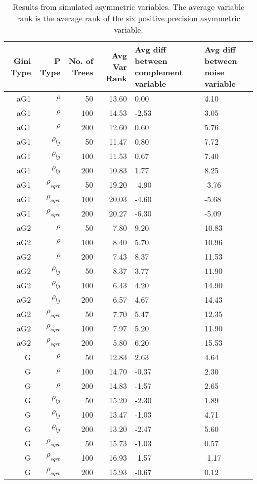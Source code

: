 \begin{table}%
  \centering
  \caption{Results from simulated asymmetric variables. The average variable rank is the average rank of the six positive precision asymmetric variable.}
\begin{tabular}{rrrrp{3cm}p{3cm}}
\hline
Gini Type & P Type & No. of Trees & Avg Var Rank & Avg diff between complement variable & Avg diff between noise variable \bigstrut\\
\hline
\renewcommand{\arraystretch}{.5}
aG1   & $\rho$ & 50    & 13.60 & 0.00  & 4.10 \bigstrut[t]\\
aG1   & $\rho$ & 100   & 14.53 & -2.53 & 3.05 \\
aG1   & $\rho$ & 200   & 12.60 & 0.60  & 5.76 \\
aG1   & $\rho_{lg}$ & 50    & 11.47 & 0.80  & 7.72 \\
aG1   & $\rho_{lg}$ & 100   & 11.53 & 0.67  & 7.40 \\
aG1   & $\rho_{lg}$ & 200   & 10.83 & 1.77  & 8.25 \\
aG1   & $\rho_{sqrt}$ & 50    & 19.20 & -4.90 & -3.76 \\
aG1   & $\rho_{sqrt}$ & 100   & 20.03 & -4.60 & -5.68 \\
aG1   & $\rho_{sqrt}$ & 200   & 20.27 & -6.30 & -5.09 \\
aG2   & $\rho$ & 50    & 7.80  & 9.20  & 10.83 \\
aG2   & $\rho$ & 100   & 8.40  & 5.70  & 10.96 \\
aG2   & $\rho$ & 200   & 7.43  & 8.37  & 11.53 \\
aG2   & $\rho_{lg}$ & 50    & 8.37  & 3.77  & 11.90 \\
aG2   & $\rho_{lg}$ & 100   & 6.43  & 4.20  & 14.90 \\
aG2   & $\rho_{lg}$ & 200   & 6.57  & 4.67  & 14.43 \\
aG2   & $\rho_{sqrt}$ & 50    & 7.70  & 5.47  & 12.35 \\
aG2   & $\rho_{sqrt}$ & 100   & 7.97  & 5.20  & 11.90 \\
aG2   & $\rho_{sqrt}$ & 200   & 5.80  & 6.20  & 15.53 \\
G     & $\rho$ & 50    & 12.83 & 2.63  & 4.64 \\
G     & $\rho$ & 100   & 14.70 & -0.37 & 2.30 \\
G     & $\rho$ & 200   & 14.83 & -1.57 & 2.65 \\
G     & $\rho_{lg}$ & 50    & 15.20 & -2.30 & 1.89 \\
G     & $\rho_{lg}$ & 100   & 13.47 & -1.03 & 4.71 \\
G     & $\rho_{lg}$ & 200   & 13.20 & -2.47 & 5.60 \\
G     & $\rho_{sqrt}$ & 50    & 15.73 & -1.03 & 0.57 \\
G     & $\rho_{sqrt}$ & 100   & 16.93 & -1.57 & -1.17 \\
G     & $\rho_{sqrt}$ & 200   & 15.93 & -0.67 & 0.12 \bigstrut[b]\\
\hline
\end{tabular}%
\label{tab:asymmetricfeaturesresults}%
\end{table}%








